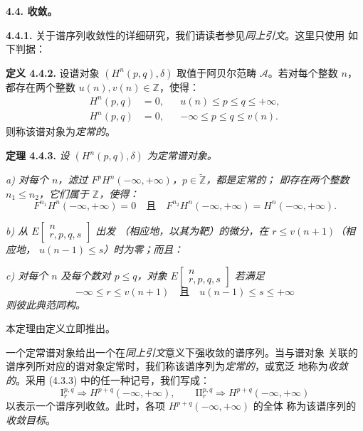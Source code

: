 \clearpage
{}%
\begingroup\small\setlength{\parskip}{0pt}\setlength{\emergencystretch}{1.5em}
\medskip\noindent\textbf{4.4. 收敛。}

\medskip\noindent\textbf{4.4.1.}\quad
关于谱序列收敛性的详细研究，我们请读者参见\emph{同上引文}。这里只使用
如下判据：

\medskip\noindent\textbf{定义 4.4.2.}\quad
设谱对象 $(H^n(p,q),\delta)$ 取值于阿贝尔范畴 $\mathcal A$。若对每个整数
$n$，都存在两个整数 $u(n),v(n)\in\mathbb Z$，使得：
\[
\begin{aligned}
H^n(p,q)&=0,&&u(n)\leq p\leq q\leq+\infty,\\
H^n(p,q)&=0,&&-\infty\leq p\leq q\leq v(n).
\end{aligned}
\]
则称该谱对象为\emph{定常的}。

\medskip\noindent\textbf{定理 4.4.3.}\quad
\textit{设 $(H^n(p,q),\delta)$ 为定常谱对象。}

\textit{a) 对每个 $n$，滤过
$F^pH^n(-\infty,+\infty)$，$p\in\widetilde{\mathbb Z}$，都是定常的；
即存在两个整数 $n_1\leq n_2$，它们属于 $\mathbb Z$，使得：}
\[
F^{n_1}H^n(-\infty,+\infty)=0
\quad\text{且}\quad
F^{n_2}H^n(-\infty,+\infty)=H^n(-\infty,+\infty).
\]

\textit{b) 从
$E\!\left[\begin{smallmatrix}n\\r,p,q,s\end{smallmatrix}\right]$ 出发
（相应地，以其为靶）的微分，在 $r\leq v(n+1)$（相应地，
$u(n-1)\leq s$）时为零；而且：}

\textit{c) 对每个 $n$ 及每个数对 $p\leq q$，对象
$E\!\left[\begin{smallmatrix}n\\r,p,q,s\end{smallmatrix}\right]$ 若满足}
\[
-\infty\leq r\leq v(n+1)
\quad\text{且}\quad
u(n-1)\leq s\leq+\infty
\]
\textit{则彼此典范同构。}

本定理由定义立即推出。

一个定常谱对象给出一个在\emph{同上引文}意义下强收敛的谱序列。当与谱对象
关联的谱序列所对应的谱对象定常时，我们称该谱序列为\emph{定常的}，或宽泛
地称为\emph{收敛的}。采用 (4.3.3) 中的任一种记号，我们写成：
\[
\mathrm I_r^{p,q}\Longrightarrow H^{p+q}(-\infty,+\infty),
\qquad
\mathrm{II}_r^{p,q}\Longrightarrow H^{p+q}(-\infty,+\infty)
\]
以表示一个谱序列收敛。此时，各项 $H^{p+q}(-\infty,+\infty)$ 的全体
称为该谱序列的\emph{收敛目标}。
\endgroup
